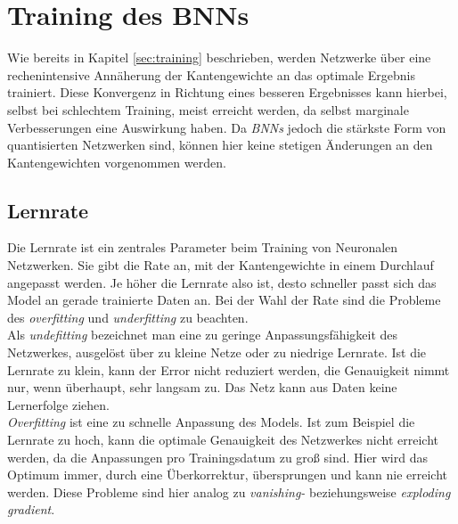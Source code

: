 \chapter{Training des BNNs}
Wie bereits in Kapitel \ref{sec:training} beschrieben, werden Netzwerke über eine rechenintensive Annäherung der Kantengewichte an das optimale Ergebnis trainiert. Diese Konvergenz in Richtung eines besseren Ergebnisses kann hierbei, selbst bei schlechtem Training, meist erreicht werden, da selbst marginale Verbesserungen eine Auswirkung haben. Da \textit{BNNs} jedoch die stärkste Form von quantisierten Netzwerken sind, können hier keine stetigen Änderungen an den Kantengewichten vorgenommen werden.
\section{Lernrate}
Die Lernrate ist ein zentrales Parameter beim Training von Neuronalen Netzwerken. Sie gibt die Rate an, mit der Kantengewichte in einem Durchlauf angepasst werden. Je höher die Lernrate also ist, desto schneller passt sich das Model an gerade trainierte Daten an. Bei der Wahl der Rate sind die Probleme des \textit{overfitting} und \textit{underfitting} zu beachten.\\ 
Als \textit{undefitting} bezeichnet man eine zu geringe Anpassungsfähigkeit des Netzwerkes, ausgelöst über zu kleine Netze oder zu niedrige Lernrate. Ist die Lernrate zu klein, kann der Error nicht reduziert werden, die Genauigkeit nimmt nur, wenn überhaupt, sehr langsam zu. Das Netz kann aus Daten keine Lernerfolge ziehen.\\
\textit{Overfitting} ist eine zu schnelle Anpassung des Models. Ist zum Beispiel die Lernrate zu hoch, kann die optimale Genauigkeit des Netzwerkes nicht erreicht werden, da die Anpassungen pro Trainingsdatum zu groß sind. Hier wird das Optimum immer, durch eine Überkorrektur, übersprungen und kann nie erreicht werden\cite{smith2018}. Diese Probleme sind hier analog zu \textit{vanishing-} beziehungsweise \textit{exploding gradient}.


